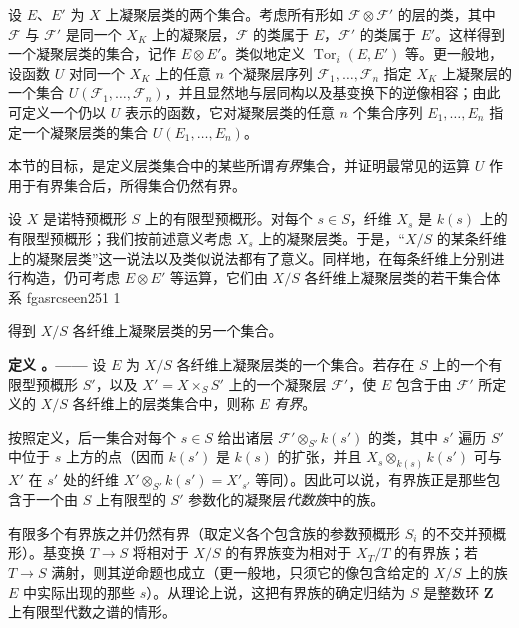 \documentclass[12pt,twoside,openany]{book}
\numberwithin{equation}{section}
\newcommand{\fgaunitid}{unbound}
\newcommand{\src}[1]{%
  \phantomsection
  \hypertarget{src:\fgaunitid:#1}{}%
  \hypertarget{fga.\fgaunitid.p#1}{}%
  \ifcsname fgasrcseen#1\endcsname\else
    \expandafter\gdef\csname fgasrcseen#1\endcsname{1}%
    \hypertarget{src:#1}{}%
  \fi
  \marginpar{\raggedleft\footnotesize\sffamily #1}%
}
\theoremstyle{plain}
\theoremstyle{definition}
\theoremstyle{remark}
\newcommand{\result}[2]{%
  \par\medskip\noindent\textbf{#1%
  \if\relax\detokenize{#2}\relax\else\space#2\fi。——}\enspace
}
\begin{document}
设 $E$、$E'$ 为 $X$ 上凝聚层类的两个集合。考虑所有形如
$\mathcal F\otimes\mathcal F'$ 的层的类，其中 $\mathcal F$ 与
$\mathcal F'$ 是同一个 $X_K$ 上的凝聚层，$\mathcal F$ 的类属于
$E$，$\mathcal F'$ 的类属于 $E'$。这样得到一个凝聚层类的集合，记作
$E\otimes E'$。类似地定义
$\operatorname{Tor}_i(E,E')$ 等。更一般地，设函数 $U$ 对同一个
$X_K$ 上的任意 $n$ 个凝聚层序列
$\mathcal F_1,\ldots,\mathcal F_n$ 指定 $X_K$ 上凝聚层的一个集合
$U(\mathcal F_1,\ldots,\mathcal F_n)$，并且显然地与层同构以及基变换下的逆像相容；由此可定义一个仍以 $U$ 表示的函数，它对凝聚层类的任意 $n$ 个集合序列
$E_1,\ldots,E_n$ 指定一个凝聚层类的集合
$U(E_1,\ldots,E_n)$。

本节的目标，是定义层类集合中的某些所谓\emph{有界}集合，并证明最常见的运算 $U$ 作用于有界集合后，所得集合仍然有界。

设 $X$ 是诺特预概形 $S$ 上的有限型预概形。对每个 $s\in S$，纤维
$X_s$ 是 $k(s)$ 上的有限型预概形；我们按前述意义考虑 $X_s$ 上的凝聚层类。于是，“$X/S$ 的某条纤维上的凝聚层类”这一说法以及类似说法都有了意义。同样地，在每条纤维上分别进行构造，仍可考虑
$E\otimes E'$ 等运算，它们由 $X/S$ 各纤维上凝聚层类的若干集合体系
\src{251}
得到 $X/S$ 各纤维上凝聚层类的另一个集合。

\result{定义}{1.1} 设 $E$ 为 $X/S$ 各纤维上凝聚层类的一个集合。若存在 $S$ 上的一个有限型预概形 $S'$，以及
$X'=X\times_S S'$ 上的一个凝聚层 $\mathcal F'$，使 $E$ 包含于由
$\mathcal F'$ 所定义的 $X/S$ 各纤维上的层类集合中，则称 $E$ \emph{有界}。

按照定义，后一集合对每个 $s\in S$ 给出诸层
$\mathcal F'\otimes_{S'}k(s')$ 的类，其中 $s'$ 遍历 $S'$ 中位于
$s$ 上方的点（因而 $k(s')$ 是 $k(s)$ 的扩张，并且
$X_s\otimes_{k(s)}k(s')$ 可与 $X'$ 在 $s'$ 处的纤维
$X'\otimes_{S'}k(s')=X'_{s'}$ 等同）。因此可以说，有界族正是那些包含于一个由 $S$ 上有限型的 $S'$ 参数化的凝聚层\emph{代数族}中的族。

有限多个有界族之并仍然有界（取定义各个包含族的参数预概形
$S_i$ 的不交并预概形）。基变换 $T\longrightarrow S$ 将相对于
$X/S$ 的有界族变为相对于 $X_T/T$ 的有界族；若
$T\longrightarrow S$ 满射，则其逆命题也成立（更一般地，只须它的像包含给定的 $X/S$ 上的族 $E$ 中实际出现的那些 $s$）。从理论上说，这把有界族的确定归结为 $S$ 是整数环 $\mathbf Z$ 上有限型代数之谱的情形。
\end{document}
